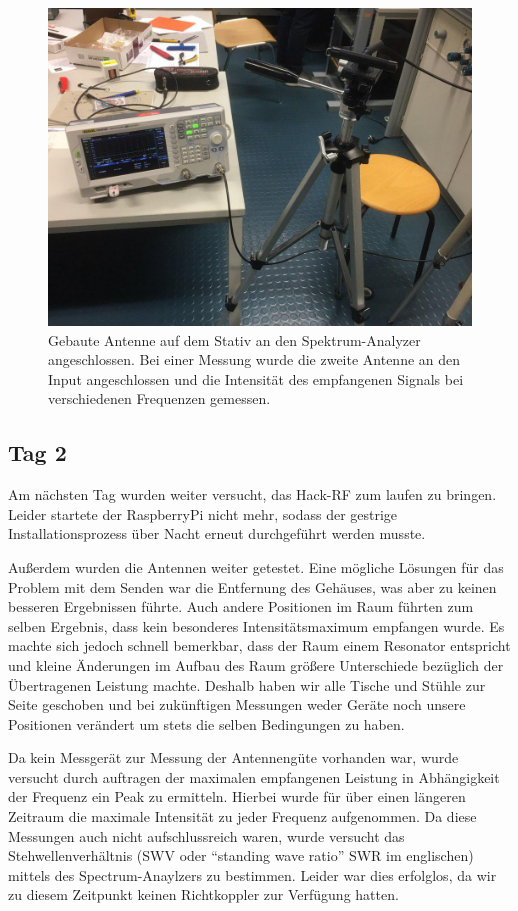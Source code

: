 \documentclass[titlepage,11pt,a4paper,ngerman]{article}
\begin{document}
\begin{figure}[ht]
	\centering
	\includegraphics[scale=0.35, trim={0cm 8cm 3cm 2cm}, clip]{Bilder/Ant_Fktgen}
	\caption{Gebaute Antenne auf dem Stativ an den Spektrum-Analyzer angeschlossen. Bei einer Messung wurde die zweite Antenne an den Input angeschlossen und die Intensität des empfangenen Signals bei verschiedenen Frequenzen gemessen.}
	\label{ersteMessung}
\end{figure}




\subsection{Tag 2}

Am nächsten Tag wurden weiter versucht, das Hack-RF zum laufen zu bringen. Leider startete der RaspberryPi nicht mehr, sodass der gestrige Installationsprozess über Nacht erneut durchgeführt werden musste.\par
Außerdem wurden die Antennen weiter getestet. Eine mögliche Lösungen für das Problem mit dem Senden war die Entfernung des Gehäuses, was aber zu keinen besseren Ergebnissen führte. Auch andere Positionen im Raum führten zum selben Ergebnis, dass kein besonderes Intensitätsmaximum empfangen wurde. Es machte sich jedoch schnell bemerkbar, dass der Raum einem Resonator entspricht und kleine Änderungen im Aufbau des Raum größere Unterschiede bezüglich der Übertragenen Leistung machte. Deshalb haben wir alle Tische und Stühle zur Seite geschoben und bei zukünftigen Messungen weder Geräte noch unsere Positionen verändert um stets die selben Bedingungen zu haben.\par
Da kein Messgerät zur Messung der Antennengüte vorhanden war, wurde versucht durch auftragen der maximalen empfangenen Leistung in Abhängigkeit der Frequenz ein Peak zu ermitteln. Hierbei wurde für über einen längeren Zeitraum die maximale Intensität zu jeder Frequenz aufgenommen. Da diese Messungen auch nicht aufschlussreich waren, wurde versucht das Stehwellenverhältnis (SWV oder ``standing wave ratio'' SWR im englischen) mittels des Spectrum-Anaylzers zu bestimmen. Leider war dies erfolglos, da wir zu diesem Zeitpunkt keinen Richtkoppler zur Verfügung hatten.
\end{document}
